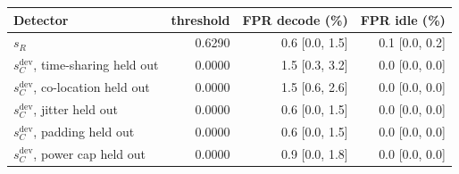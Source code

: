 \begin{tabular}{lrrr}
\toprule
Detector & threshold & FPR decode (\%) & FPR idle (\%) \\
\midrule
$s_R$ & 0.6290 & 0.6 [0.0, 1.5] & 0.1 [0.0, 0.2] \\
$s_C^{\mathrm{dev}}$, time-sharing held out & 0.0000 & 1.5 [0.3, 3.2] & 0.0 [0.0, 0.0] \\
$s_C^{\mathrm{dev}}$, co-location held out & 0.0000 & 1.5 [0.6, 2.6] & 0.0 [0.0, 0.0] \\
$s_C^{\mathrm{dev}}$, jitter held out & 0.0000 & 0.6 [0.0, 1.5] & 0.0 [0.0, 0.0] \\
$s_C^{\mathrm{dev}}$, padding held out & 0.0000 & 0.6 [0.0, 1.5] & 0.0 [0.0, 0.0] \\
$s_C^{\mathrm{dev}}$, power cap held out & 0.0000 & 0.9 [0.0, 1.8] & 0.0 [0.0, 0.0] \\
\bottomrule
\end{tabular}
